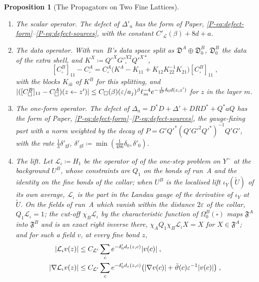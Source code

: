 \documentclass[11pt]{preprint}
\DeclarePairedDelimiter{\abs}{\lvert}{\rvert}
\numberwithin{equation}{section}
\newtheorem{proposition}{Proposition}
\theoremstyle{definition}
\theoremstyle{remark}
\theoremstyle{plain}
\begin{document}
\begin{proposition}[The Propagators on Two Fine Lattices]
\begin{enumerate}[label=(\alph*)]
\item \emph{The scalar operator.} The defect of $\Delta'_a$ has the form of Paper, \eqref{P-eq:defect-form}--\eqref{P-eq:defect-sources}, with the constant $C'_{\mathcal L}(\beta) + 8d + a$.
\item \emph{The data operator.} With run~B's data space split as $\mathfrak D^A \oplus \mathfrak D^B_0$, $\mathfrak D^B_0$ the data of the extra shell, and $K^X \coloneqq Q'^XG'^{X2}_\square Q'^{X*}$,
\begin{equation}\label{eq:data-identity}
    [C^B_\square]_{11} - C^A_\square = C^A_\square\bigl(K^A - K_{11} + K_{12}K_{22}^{-1}K_{21}\bigr)[C^B_\square]_{11}\;,
\end{equation}
with the blocks $K_{ik}$ of $K^B$ for this splitting, and $\abs{([C^B_\square]_{11} - C^A_\square)(z \leftarrow z')} \leq C_\square(\beta)(\varepsilon/a_j)^\beta\ell_m^{-4}e^{-\frac{1}{27}\delta_0d(z, z')}$ for $z$ in the layer $m$.
\item \emph{The one-form operator.} The defect of $\Delta_a = D^*D + \Delta' + DRD^* + Q^*aQ$ has the form of Paper, \eqref{P-eq:defect-form}--\eqref{P-eq:defect-sources}, the gauge-fixing part with a norm weighted by the decay of $P = G'Q'^*(Q'G'^2Q'^*)^{-1}Q'G'$, with the rate $\frac13\delta'_{\mathrm{gf}}$, $\delta'_{\mathrm{gf}} \coloneqq \min(\frac{1}{486}\delta_0, \delta'_0)$.
\item \emph{The lift.} Let $\mathcal L_\iota \coloneqq H_1$ be the operator of \cite[(3.129), p.~421]{BalabanPBG} of the one-step problem on $Y^\sim$ at the background $U^B$, whose constraints are $Q_1$ on the bonds of run~A and the identity on the fine bonds of the collar; when $U^B$ is the localised lift $\iota_Y(\tilde U)$ of its own average, $\mathcal L_\iota$ is the part in the Landau gauge of the derivative of $\iota_Y$ at $\tilde U$. On the fields of run~A which vanish within the distance $2\varepsilon$ of the collar, $Q_1\mathcal L_\iota = 1$; the cut-off $\chi_B\mathcal L_\iota$ by the characteristic function of $\Omega^B_0(\square)$ maps $\mathfrak F^A$ into $\mathfrak F^B$ and is an exact right inverse there, $\chi_AQ_1\chi_B\mathcal L_\iota X = X$ for $X \in \mathfrak F^A$; and for such a field $v$, at every fine bond $z$,
\begin{equation}\label{eq:lift-regularity}
\begin{aligned}
    \abs{\mathcal L_\iota v(z)} &\leq C_{\mathcal L'}\sum_ce^{-\delta'_0d_\varepsilon(z, c)}\abs{v(c)}\;,\\
    \abs{\nabla\mathcal L_\iota v(z)} &\leq C_{\mathcal L'}\sum_ce^{-\delta'_0d_\varepsilon(z, c)}\bigl(\abs{\nabla v(c)} + \bar\vartheta(c)\varepsilon^{-1}\abs{v(c)}\bigr)\;,

\end{aligned}
\end{equation}
\end{enumerate}
\end{proposition}
\end{document}
